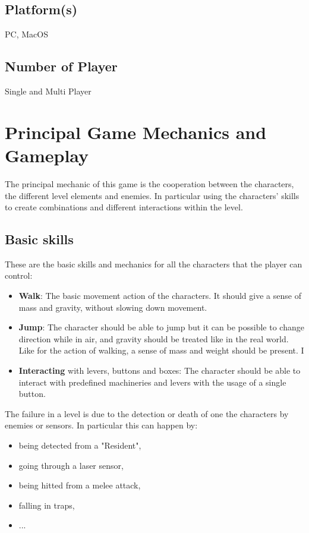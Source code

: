 \documentclass[12pt, a4paper]{report}
\begin{document}
\section*{Platform(s)}
PC, MacOS
\section*{Number of Player}
Single and Multi Player

\chapter{Principal Game Mechanics and Gameplay}
The principal mechanic of this game is the cooperation between the characters, the different level elements and enemies. In particular using the characters’ skills to create combinations and different interactions within the level.

\section*{Basic skills}
These are the basic skills and mechanics for all the characters that the player can control:
\begin{itemize}
	\item \textbf{Walk}: The basic movement action of the characters. It should give a sense of mass and gravity, without slowing down movement.
	\item \textbf{Jump}: The character should be able to jump but it can be possible to change direction while in air, and gravity should be treated like in the real world. Like for the action of walking, a sense of mass and weight should be present. 
	I\item \textbf{Interacting} with levers, buttons and boxes: The character should be able to interact with predefined machineries and levers with the usage of a single button.
\end{itemize}

The failure in a level is due to the detection or death of one the characters by enemies or sensors. In particular this can happen by:
\begin{itemize}
	\item being detected from a "Resident",
	\item going through a laser sensor,
	\item being hitted from a melee attack,
	\item falling in traps,
	\item ...
\end{itemize}
\end{document}

